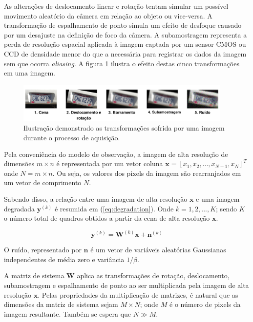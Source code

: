 As alterações de deslocamento linear e rotação tentam simular um possível movimento
aleatório da câmera em relação ao objeto ou vice-versa.
A transformação de espalhamento de ponto simula um efeito de desfoque causado por um
desajuste na definição de foco da câmera.
A subamostragem representa a perda de resolução espacial aplicada à imagem captada
por um sensor CMOS ou CCD de densidade menor do que a necessária para registrar os dados da imagem sem que ocorra \emph{aliasing}.
A figura \ref{fig:image_transformations} ilustra o efeito destas cinco transformações em uma imagem.

\begin{figure}[h]
	\centering
	\caption{\label{fig:image_transformations}Ilustração demonstrado as transformações sofrida por uma imagem durante o processo de aquisição.}
	\includegraphics[width=0.95\textwidth]{./figures/image_transformations.pdf}
\end{figure}

Pela conveniência do modelo de observação, a imagem de alta resolução de dimensões $m \times n$ é representada por um vetor coluna $\mathbf{x} = [x_1, x_2, ... , x_{N-1}, x_N]^T$ onde $N ={} m \times n$. Ou seja, os valores dos pixels da imagem são rearranjados em um vetor de comprimento $N$.

Sabendo disso, a relação entre uma imagem de alta resolução $\mathbf{x}$ e uma imagem degradada $\mathbf{y}^{(k)}$ é resumida em (\ref{eq:degradation}). Onde $k = 1,2,...,K$; sendo $K$ o número total de quadros obtidos a partir da cena de alta resolução $\mathbf{x}$.

\begin{equation}
	\label{eq:degradation}
	\mathbf{y}^{(k)} = \mathbf{W}^{(k)}\mathbf{x} + \mathbf{n}^{(k)}
\end{equation}

O ruído, representado por $\mathbf{n}$ é um vetor de variáveis aleatórias Gaussianas independentes de média zero e variância $1/\beta$.

A matriz de sistema $\mathbf{W}$ aplica as transformações de rotação, deslocamento, subamostragem e espalhamento de ponto ao ser multiplicada pela imagem de alta resolução $\mathbf{x}$.
Pelas propriedades da multiplicação de matrizes, é natural que as dimensões da matriz de sistema sejam $M \times N$; onde $M$ é o número de pixels da imagem resultante.
Também se espera que $N \gg M$.


